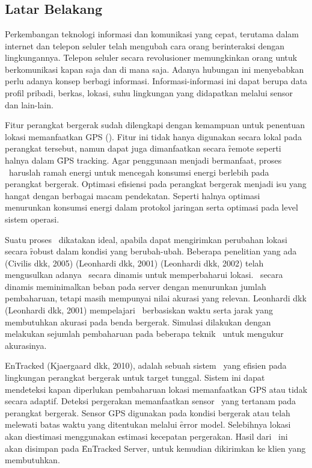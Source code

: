 \chapter{\babSatu}

\section{Latar Belakang}

Perkembangan teknologi informasi dan komunikasi yang cepat, terutama dalam
internet dan telepon seluler telah mengubah cara orang berinteraksi dengan
lingkungannya.  Telepon seluler secara revolusioner memungkinkan orang untuk
berkomunikasi kapan saja dan di mana saja. Adanya hubungan ini menyebabkan perlu
adanya konsep berbagi informasi. Informasi-informasi ini dapat berupa data
profil pribadi, berkas, lokasi, suhu lingkungan yang didapatkan melalui sensor
dan lain-lain.

Fitur perangkat bergerak sudah dilengkapi dengan kemampuan untuk penentuan
lokasi memanfaatkan GPS (\GPS).  Fitur ini tidak hanya digunakan secara lokal
pada perangkat tersebut, namun dapat juga dimanfaatkan secara \f{remote} seperti
halnya dalam \f{GPS tracking}. Agar penggunaan menjadi bermanfaat, proses
\tracking~haruslah ramah energi untuk mencegah konsumsi energi berlebih pada
perangkat bergerak. Optimasi efisiensi pada perangkat bergerak menjadi isu yang
hangat dengan berbagai macam pendekatan. Seperti halnya optimasi menurunkan
konsumsi energi dalam protokol jaringan serta optimasi pada level sistem
operasi.

Suatu proses \tracking~dikatakan ideal, apabila dapat mengirimkan perubahan
lokasi secara \f{robust} dalam kondisi yang berubah-ubah. Beberapa penelitian
yang ada (Civilis dkk, 2005) (Leonhardi dkk, 2001) (Leonhardi dkk, 2002) telah
mengusulkan adanya \tracking~secara dinamis untuk memperbaharui lokasi.
\tracking~secara dinamis meminimalkan beban pada server dengan menurunkan jumlah
pembaharuan, tetapi masih mempunyai nilai akurasi yang relevan.  Leonhardi dkk
(Leonhardi dkk, 2001) mempelajari \tracking~berbasiskan waktu serta jarak yang
membutuhkan akurasi pada benda bergerak. Simulasi dilakukan dengan melakukan
sejumlah pembaharuan pada beberapa teknik \tracking~untuk mengukur akurasinya.

EnTracked (Kjaergaard dkk, 2010), adalah sebuah sistem \tracking~yang efisien
pada lingkungan perangkat bergerak untuk target tunggal. Sistem ini dapat
mendeteksi kapan diperlukan pembaharuan lokasi memanfaatkan GPS atau tidak
secara adaptif. Deteksi pergerakan memanfaatkan sensor \acc~yang tertanam pada
perangkat bergerak. Sensor GPS digunakan pada kondisi bergerak atau telah
melewati batas waktu yang ditentukan melalui \f{error model}. Selebihnya lokasi
akan diestimasi menggunakan estimasi kecepatan pergerakan. Hasil dari
\tracking~ini akan disimpan pada \f{EnTracked Server}, untuk kemudian dikirimkan
ke klien yang membutuhkan.

